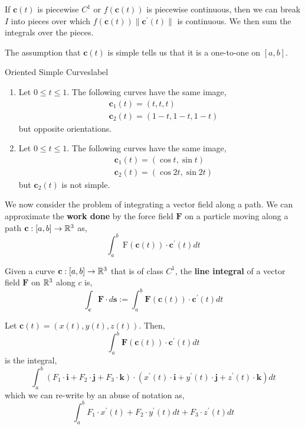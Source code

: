 \begin{rmk}
	If $\mathbf{c}(t)$ is piecewise $C^1$ or $f(\mathbf{c}(t))$ is piecewise continuous, then we can break $I$ into pieces over which $f(\mathbf{c}(t)) \|\mathbf{c}^{\prime}(t)\|$ is continuous. We then sum the integrals over the pieces.
\end{rmk}

\begin{marginfigure}
	The assumption that $\mathbf{c}(t)$ is simple tells us that it is a one-to-one on $[a,b]$.
\end{marginfigure}

\begin{ex}{Oriented Simple Curves}{label}
	\begin{enumerate}
		\item Let $0 \leq t \leq 1$. The following curves have the same image,
		\begin{align*}
			&\mathbf{c}_1(t) = (t, t, t) \\
			&\mathbf{c}_2(t) = (1-t, 1-t, 1-t)
		\end{align*}
		but opposite orientations.
		\item Let $0 \leq t \leq 1$. The following curves have the same image,
		\begin{align*}
			&\mathbf{c}_1(t) = (\cos t, \sin t) \\
			&\mathbf{c}_2(t) = (\cos 2t, \sin 2t)
		\end{align*}
		 but $\mathbf{c}_2(t)$ is not simple.
	\end{enumerate}
\end{ex}

\hfill

\noindent We now consider the problem of integrating a vector field along a path. We can approximate the \textbf{work done} by the force field $\mathbf{F}$ on a particle moving along a path $\mathbf{c}:[a,b] \rightarrow \mathbb{R}^3$ as,
\[\int_a^b \mathrm{~F}(\mathbf{c}(t)) \cdot \mathbf{c}^{\prime}(t) d t\]

\hfill

\begin{defn}
	Given a curve $\mathbf{c}: [a,b] \rightarrow \mathbb{R}^3$ that is of class $C^1$, the \textbf{line integral} of a vector field $\mathbf{F}$ on $\mathbb{R}^3$ along $c$ is,
	\[\int_{\mathbf{c}} \mathbf{F} \cdot d \mathbf{s}:=\int_a^b \mathbf{F}(\mathbf{c}(t)) \cdot \mathbf{c}^{\prime}(t) d t\]
\end{defn}

\begin{rmk}[Notation]
	Let $\mathbf{c}(t) = (x(t), y(t), z(t))$. Then,
	\[\int_a^b \mathbf{F}(\mathbf{c}(t)) \cdot \mathbf{c}^{\prime}(t) d t\]
	is the integral,
	\[\int_a^b (F_1 \cdot \mathbf{i} + F_2 \cdot \mathbf{j} + F_3 \cdot \mathbf{k}) \cdot (x^{\prime}(t) \cdot \mathbf{i}+y^{\prime}(t) \cdot \mathbf{j}+z^{\prime}(t) \cdot \mathbf{k}) dt\]
	which we can re-write by an abuse of notation as,
	\[\int_a^b F_1 \cdot x^{\prime}(t)+F_2 \cdot y^{\prime}(t) dt + F_3 \cdot z^{\prime}(t) dt\]
\end{rmk}

